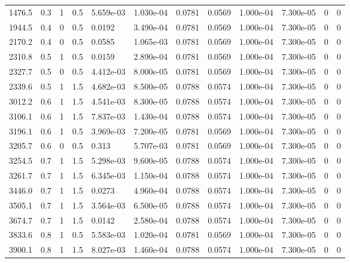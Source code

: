 \documentclass[preview]{standalone}
\begin{document}
{{\begin{tabular}{L{1.2cm}C{1.2cm} C{0.3cm}C{0.5cm} C{1.4cm}C{1.4cm} C{1.4cm}C{1.4cm} C{1.6cm}C{1.6cm} C{1.6cm}C{1.6cm}}
  1476.5  &   0.3  & 1     & 0.5 &  5.659e-03  & 1.030e-04  &  0.0781&   0.0569& 1.000e-04 & 7.300e-05   &  0 & 0  \\ 
  1944.5  &   0.4  & 0     & 0.5 &  0.0192  & 3.490e-04  &  0.0781&   0.0569& 1.000e-04 & 7.300e-05   &  0 & 0  \\ 
  2170.2  &   0.4  & 0     & 0.5 &  0.0585  & 1.065e-03  &  0.0781&   0.0569& 1.000e-04 & 7.300e-05   &  0 & 0  \\ 
  2310.8  &   0.5  & 1     & 0.5 &  0.0159  & 2.890e-04  &  0.0781&   0.0569& 1.000e-04 & 7.300e-05   &  0 & 0  \\ 
  2327.7  &   0.5  & 0     & 0.5 &  4.412e-03  & 8.000e-05  &  0.0781&   0.0569& 1.000e-04 & 7.300e-05   &  0 & 0  \\ 
  2339.6  &   0.5  & 1     & 1.5 &  4.682e-03  & 8.500e-05  &  0.0788&   0.0574& 1.000e-04 & 7.300e-05   &  0 & 0  \\ 
  3012.2  &   0.6  & 1     & 1.5 &  4.541e-03  & 8.300e-05  &  0.0788&   0.0574& 1.000e-04 & 7.300e-05   &  0 & 0  \\ 
  3106.1  &   0.6  & 1     & 1.5 &  7.837e-03  & 1.430e-04  &  0.0788&   0.0574& 1.000e-04 & 7.300e-05   &  0 & 0  \\ 
  3196.1  &   0.6  & 1     & 0.5 &  3.969e-03  & 7.200e-05  &  0.0781&   0.0569& 1.000e-04 & 7.300e-05   &  0 & 0  \\ 
  3205.7  &   0.6  & 0     & 0.5 &  0.313  & 5.707e-03  &  0.0781&   0.0569& 1.000e-04 & 7.300e-05   &  0 & 0  \\ 
  3254.5  &   0.7  & 1     & 1.5 &  5.298e-03  & 9.600e-05  &  0.0788&   0.0574& 1.000e-04 & 7.300e-05   &  0 & 0  \\ 
  3261.7  &   0.7  & 1     & 1.5 &  6.345e-03  & 1.150e-04  &  0.0788&   0.0574& 1.000e-04 & 7.300e-05   &  0 & 0  \\ 
  3446.0  &   0.7  & 1     & 1.5 &  0.0273  & 4.960e-04  &  0.0788&   0.0574& 1.000e-04 & 7.300e-05   &  0 & 0  \\ 
  3505.1  &   0.7  & 1     & 1.5 &  3.564e-03  & 6.500e-05  &  0.0788&   0.0574& 1.000e-04 & 7.300e-05   &  0 & 0  \\ 
  3674.7  &   0.7  & 1     & 1.5 &  0.0142  & 2.580e-04  &  0.0788&   0.0574& 1.000e-04 & 7.300e-05   &  0 & 0  \\ 
  3833.6  &   0.8  & 1     & 0.5 &  5.583e-03  & 1.020e-04  &  0.0781&   0.0569& 1.000e-04 & 7.300e-05   &  0 & 0  \\ 
  3900.1  &   0.8  & 1     & 1.5 &  8.027e-03  & 1.460e-04  &  0.0788&   0.0574& 1.000e-04 & 7.300e-05   &  0 & 0  \\ 

\end{tabular}}}
\end{document}
